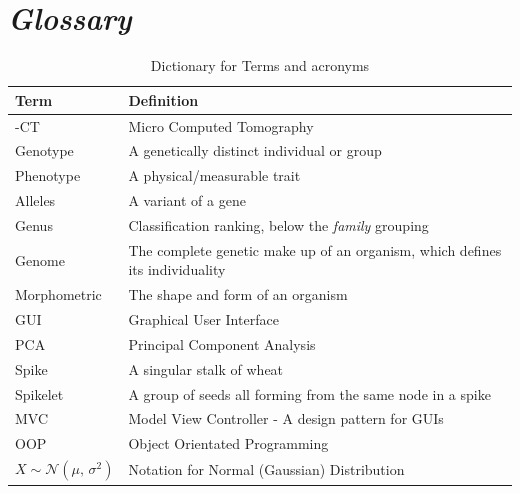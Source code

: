 \documentclass[11pt]{report}
\begin{document}
\chapter{\emph{Glossary}}
\label{sec:orgf2bccbf}
\begin{table}[htbp]
\caption{\label{tab:orgf5a821f}
Dictionary for Terms and acronyms}
\centering
\begin{tabularx}{\textwidth}{|l|X|}
\hline
\textbf{Term} & \textbf{Definition}\\
\hline
\textmu{}-CT & Micro Computed Tomography\\
\hline
Genotype & A genetically distinct individual or group\\
\hline
Phenotype & A physical/measurable trait\\
\hline
Alleles & A variant of a gene\\
\hline
Genus & Classification ranking, below the \emph{family} grouping\\
\hline
Genome & The complete genetic make up of an organism, which defines its individuality\\
\hline
Morphometric & The shape and form of an organism\\
\hline
GUI & Graphical User Interface\\
\hline
PCA & Principal Component Analysis\\
\hline
Spike & A singular stalk of wheat\\
\hline
Spikelet & A group of seeds all forming from the same node in a spike\\
\hline
MVC & Model View Controller - A design pattern for GUIs\\
\hline
OOP & Object Orientated Programming\\
\hline
\(X \sim \mathcal{N}(\mu,\,\sigma^{2})\) & Notation for Normal (Gaussian) Distribution\\
\hline
\end{tabularx}
\end{table}

\clearpage
\end{document}
